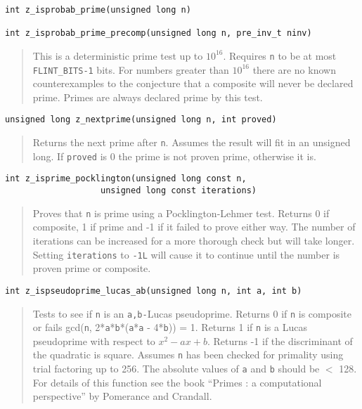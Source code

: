 \documentclass[a4paper,10pt]{article}
\newcommand{\code}{\lstinline}
\begin{document}
\begin{lstlisting}
int z_isprobab_prime(unsigned long n)

int z_isprobab_prime_precomp(unsigned long n, pre_inv_t ninv)
\end{lstlisting}
\begin{quote}
This is a deterministic prime test up to $10^{16}$. Requires \code{n} to be at most \code{FLINT_BITS-1} bits.  For numbers greater than $10^{16}$ there are no known counterexamples to the conjecture that a composite will never be declared prime. Primes are always declared prime by this test.
\end{quote}

\begin{lstlisting}
unsigned long z_nextprime(unsigned long n, int proved)
\end{lstlisting}
\begin{quote}
Returns the next prime after \code{n}.  Assumes the result will fit in an unsigned long.  If \code{proved} is 0 the prime is not proven prime, otherwise it is.
\end{quote}

\begin{lstlisting}
int z_isprime_pocklington(unsigned long const n,
                   unsigned long const iterations)
\end{lstlisting}
\begin{quote}
Proves that \code{n} is prime using a Pocklington-Lehmer test. Returns 0 if composite, 1 if prime and -1 if it failed to prove either way. The number of iterations can be increased for a more thorough check but will take longer. Setting \code{iterations} to \code{-1L} will cause it to continue until the number is proven prime or composite.
\end{quote}

\begin{lstlisting}
int z_ispseudoprime_lucas_ab(unsigned long n, int a, int b)
\end{lstlisting}
\begin{quote}
Tests to see if \code{n} is an \code{a,b-}Lucas pseudoprime.  Returns 0 if \code{n} is composite or fails gcd(\code{n}, 2*\code{a}*\code{b}*(\code{a}*\code{a} - 4*\code{b})) = 1.  Returns 1 if \code{n} is a Lucas pseudoprime with respect to $x^2 - ax + b$.  Returns -1 if the discriminant of the quadratic is square.  Assumes \code{n} has been checked for primality using trial factoring up to 256.  The absolute values of \code{a} and \code{b} should be $<$ 128. For details of this function see the book ``Primes : a computational perspective'' by Pomerance and Crandall.
\end{quote}
\end{document}
